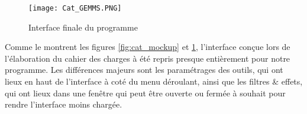 \begin{figure}[H]
	\caption{Interface finale du programme}
	\centering
	\texttt{[image: Cat\_GEMMS.PNG]}
	\label{fig:cat_gemms}
\end{figure}

Comme le montrent les figures \ref{fig:cat_mockup} et \ref{fig:cat_gemms}, l'interface conçue lors de l'élaboration du cahier des charges à été repris presque entièrement pour notre programme. Les différences majeurs sont les paramétrages des outils, qui ont lieux en haut de l'interface à coté du menu déroulant, ainsi que les filtres \& effets, qui ont lieux dans une fenêtre qui peut être ouverte ou fermée à souhait pour rendre l'interface moins chargée. 